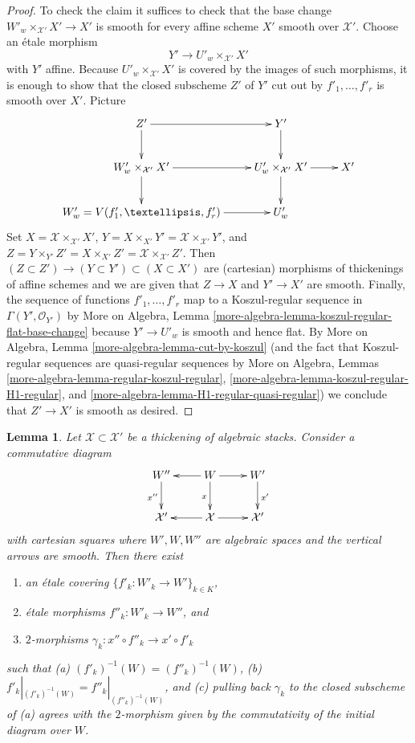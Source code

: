 \documentclass{stacks-project}
\theoremstyle{plain}
\newtheorem{lemma}[subsection]{Lemma}
\theoremstyle{definition}
\theoremstyle{remark}
\numberwithin{equation}{subsection}
\begin{document}
\begin{proof}
\medskip\noindent
To check the claim it suffices to check that the base change
$W'_w \times_{\mathcal{X}'} X' \to X'$ is smooth for every
affine scheme $X'$ smooth over $\mathcal{X}'$. Choose an
\'etale morphism
$$
Y' \to U'_w \times_{\mathcal{X}'} X'
$$
with $Y'$ affine. Because $U'_w \times_{\mathcal{X}'} X'$ is covered
by the images of such morphisms, it is enough to show that the closed
subscheme $Z'$ of $Y'$ cut out by $f'_1, \ldots, f'_r$ is smooth over $X'$.
Picture
$$
\xymatrix{
Z' \ar[r] \ar[d] & Y' \ar[d] \\
W'_w \times_{\mathcal{X}'} X' \ar[d] \ar[r] &
U'_w \times_{\mathcal{X}'} X' \ar[d] \ar[r] & X' \\
W'_w = V(f'_1, \ldots, f'_r) \ar[r] & U'_w
}
$$
Set $X = \mathcal{X} \times_{\mathcal{X}'} X'$,
$Y = X \times_{X'} Y' = \mathcal{X} \times_{\mathcal{X}'} Y'$, and
$Z = Y \times_{Y'} Z' = X \times_{X'} Z' =
\mathcal{X} \times_{\mathcal{X}'} Z'$.
Then $(Z \subset Z') \to (Y \subset Y') \subset (X \subset X')$
are (cartesian) morphisms of thickenings of affine schemes and
we are given that $Z \to X$ and $Y' \to X'$ are smooth.
Finally, the sequence of functions $f'_1, \ldots, f'_r$
map to a Koszul-regular sequence in $\Gamma(Y', \mathcal{O}_{Y'})$ by
More on Algebra, Lemma \ref{more-algebra-lemma-koszul-regular-flat-base-change}
because $Y' \to U'_w$ is smooth and hence flat.
By More on Algebra, Lemma \ref{more-algebra-lemma-cut-by-koszul}
(and the fact that Koszul-regular sequences are quasi-regular sequences
by More on Algebra, Lemmas \ref{more-algebra-lemma-regular-koszul-regular},
\ref{more-algebra-lemma-koszul-regular-H1-regular}, and
\ref{more-algebra-lemma-H1-regular-quasi-regular})
we conclude that $Z' \to X'$ is smooth as desired.
\end{proof}

\begin{lemma}
\label{lemma-etale-local-lifts-isomorphic}
Let $\mathcal{X} \subset \mathcal{X}'$ be a thickening of algebraic stacks.
Consider a commutative diagram
$$
\xymatrix{
W'' \ar[d]_{x''} & W \ar[l] \ar[r] \ar[d]_x & W' \ar[d]^{x'} \\
\mathcal{X}' & \mathcal{X} \ar[l] \ar[r] & \mathcal{X}'
}
$$
with cartesian squares where $W', W, W''$ are algebraic spaces and
the vertical arrows are smooth. Then there exist
\begin{enumerate}
\item an \'etale covering $\{f'_k : W'_k \to W'\}_{k \in K}$,
\item \'etale morphisms $f''_k : W'_k \to W''$, and
\item $2$-morphisms $\gamma_k : x'' \circ f''_k \to x' \circ f'_k$
\end{enumerate}
such that (a) $(f'_k)^{-1}(W) = (f''_k)^{-1}(W)$, (b)
$f'_k|_{(f'_k)^{-1}(W)} = f''_k|_{(f''_k)^{-1}(W)}$, and
(c) pulling back $\gamma_k$ to the closed subscheme of (a)
agrees with the $2$-morphism given by the commutativity of
the initial diagram over $W$.
\end{lemma}
\end{document}
